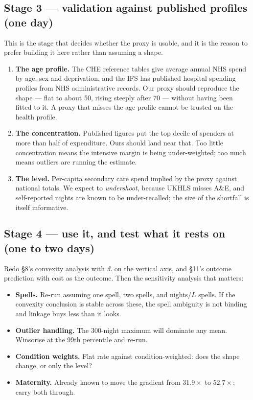 \documentclass[11pt]{article}
\begin{document}
\subsection*{Stage 3 --- validation against published profiles (one day)}

This is the stage that decides whether the proxy is usable, and it is the
reason to prefer building it here rather than assuming a shape.

\begin{enumerate}\itemsep2pt
\item \textbf{The age profile.} The CHE reference tables give average annual
NHS spend by age, sex and deprivation, and the IFS has published hospital
spending profiles from NHS administrative records. Our proxy should reproduce
the shape --- flat to about 50, rising steeply after 70 --- without having
been fitted to it. A proxy that misses the age profile cannot be trusted on
the health profile.
\item \textbf{The concentration.} Published figures put the top decile of
spenders at more than half of expenditure. Ours should land near that. Too
little concentration means the intensive margin is being under-weighted; too
much means outliers are running the estimate.
\item \textbf{The level.} Per-capita secondary care spend implied by the
proxy against national totals. We expect to \emph{undershoot}, because
UKHLS misses A\&E, and self-reported nights are known to be under-recalled;
the size of the shortfall is itself informative.
\end{enumerate}

\subsection*{Stage 4 --- use it, and test what it rests on (one to two days)}

Redo \S8's convexity analysis with $\pounds$ on the vertical axis, and
\S11's outcome prediction with cost as the outcome. Then the sensitivity
analysis that matters:

\begin{itemize}\itemsep2pt
\item \textbf{Spells.} Re-run assuming one spell, two spells, and
nights$/\bar{L}$ spells. If the convexity conclusion is stable across these,
the spell ambiguity is not binding and linkage buys less than it looks.
\item \textbf{Outlier handling.} The 300-night maximum will dominate any
mean. Winsorise at the 99th percentile and re-run.
\item \textbf{Condition weights.} Flat rate against condition-weighted: does
the shape change, or only the level?
\item \textbf{Maternity.} Already known to move the gradient from
$31.9\times$ to $52.7\times$; carry both through.
\end{itemize}
\end{document}
